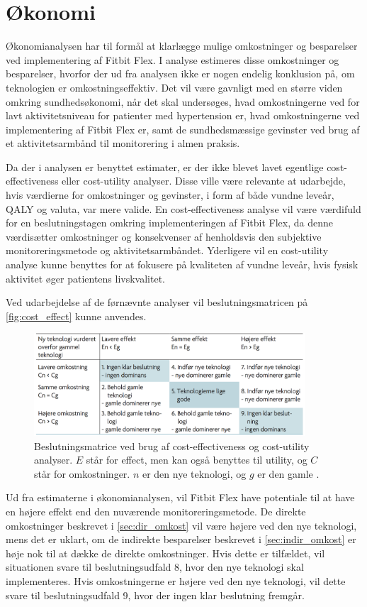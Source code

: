 \section{Økonomi} \label{sec:dis_oekonomi}
Økonomianalysen har til formål at klarlægge mulige omkostninger og besparelser ved implementering af Fitbit Flex. I analyse estimeres disse omkostninger og besparelser, hvorfor der ud fra analysen ikke er nogen endelig konklusion på, om teknologien er omkostningseffektiv. Det vil være gavnligt med en større viden omkring sundhedsøkonomi, når det skal undersøges, hvad omkostningerne ved for lavt aktivitetsniveau for patienter med hypertension er, hvad omkostningerne ved implementering af Fitbit Flex er, samt de sundhedsmæssige gevinster ved brug af et aktivitetsarmbånd til monitorering i almen praksis. 

Da der i analysen er benyttet estimater, er der ikke blevet lavet egentlige cost-effectiveness eller cost-utility analyser. Disse ville være relevante at udarbejde, hvis værdierne for omkostninger og gevinster, i form af både vundne leveår, QALY og valuta, var mere valide. En cost-effectiveness analyse vil være værdifuld for en beslutningstagen omkring implementeringen af Fitbit Flex, da denne værdisætter omkostninger og konsekvenser af henholdsvis den subjektive monitoreringsmetode og aktivitetsarmbåndet. Yderligere vil en cost-utility analyse kunne benyttes for at fokusere på kvaliteten af vundne leveår, hvis fysisk aktivitet øger patientens livskvalitet.

Ved udarbejdelse af de førnævnte analyser vil beslutningsmatricen på \autoref{fig:cost_effect} kunne anvendes. 

\begin{figure}[H]
	\centering
	\includegraphics[width=0.9\textwidth]{figures/cost-effectiveness}
	\caption{Beslutningsmatrice ved brug af cost-effectiveness og cost-utility analyser. $E$ står for effect, men kan også benyttes til utility, og $C$ står for omkostninger. $n$ er den nye teknologi, og $g$ er den gamle \citep{mtvhaandbog}.}
	\label{fig:cost_effect}
\end{figure}

\noindent
Ud fra estimaterne i økonomianalysen, vil Fitbit Flex have potentiale til at have en højere effekt end den nuværende monitoreringsmetode. De direkte omkostninger beskrevet i \autoref{sec:dir_omkost} vil være højere ved den nye teknologi, mens det er uklart, om de indirekte besparelser beskrevet i \autoref{sec:indir_omkost} er høje nok til at dække de direkte omkostninger. Hvis dette er tilfældet, vil situationen svare til beslutningsudfald 8, hvor den nye teknologi skal implementeres. Hvis omkostningerne er højere ved den nye teknologi, vil dette svare til beslutningsudfald 9, hvor der ingen klar beslutning fremgår. 